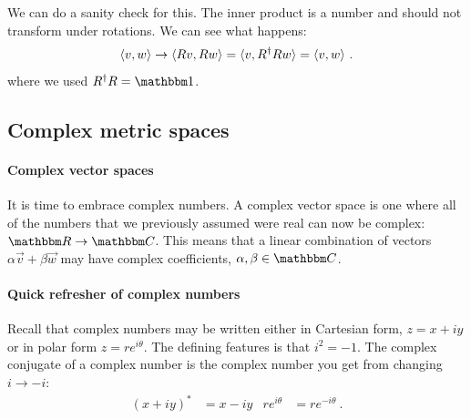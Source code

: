 \documentclass[12pt]{article}
\begin{document}
\begin{example}
We can do a sanity check for this. The inner product is a number and should not transform under rotations. We can see what happens:
\begin{align}
    \langle v , w \rangle \to \langle Rv, Rw \rangle = \langle v, R^\dag R w \rangle = \langle v, w \rangle \ .
\end{align}
where we used $R^\dag R = \one$. 




\end{example}


\subsection{Complex metric spaces}

\paragraph{Complex vector spaces}
It is time to embrace complex numbers. A complex vector space is one where all of the numbers that we previously assumed were real can now be complex: $\RR \to \CC$. This means that a linear combination of vectors $\alpha\vec{v}+ \beta\vec{w}$ may have complex coefficients, $\alpha,\beta\in\CC$. 

\paragraph{Quick refresher of complex numbers}
Recall that complex numbers may be written either in Cartesian form, $z = x+iy$ or in polar form $z= re^{i\theta}$. The defining features is that $i^2 = -1$. The complex conjugate of a complex number is the complex number you get from changing $i\to -i$:
\begin{align}
    (x+iy)^* &= x-iy
    &
    re^{i\theta} &= re^{-i\theta} \ .
\end{align}
\end{document}
